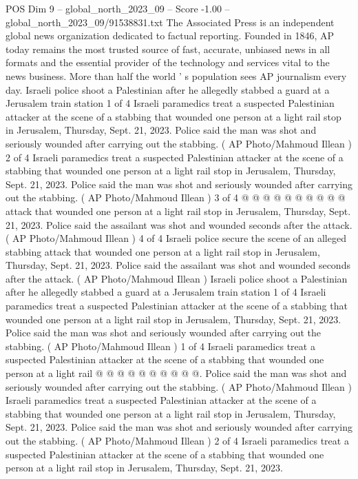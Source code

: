 \begin{textsample}{POS Dim 9 – global\_north\_2023\_09 – Score -1.00 – global\_north\_2023\_09/91538831.txt}  \label{ex:f9_pos_414}
The Associated Press is an independent global news organization dedicated to factual reporting.
Founded in 1846, AP today remains the most trusted source of fast, accurate, unbiased news in all formats and the essential provider of the technology and services vital to the news business.
More than half the world ' s population sees AP journalism every day.
Israeli police shoot a Palestinian after he allegedly stabbed a guard at a Jerusalem train station 1 of 4 Israeli paramedics treat a suspected Palestinian attacker at the scene of a stabbing that wounded one person at a light rail stop in Jerusalem, Thursday, Sept. 21, 2023.
Police said the man was shot and seriously wounded after carrying out the stabbing. ( AP Photo/Mahmoud Illean ) 2 of 4 Israeli paramedics treat a suspected Palestinian attacker at the scene of a stabbing that wounded one person at a light rail stop in Jerusalem, Thursday, Sept. 21, 2023.
Police said the man was shot and seriously wounded after carrying out the stabbing. ( AP Photo/Mahmoud Illean ) 3 of 4 @ @ @ @ @ @ @ @ @ @ attack that wounded one person at a light rail stop in Jerusalem, Thursday, Sept. 21, 2023.
Police said the assailant was shot and wounded seconds after the attack. ( AP Photo/Mahmoud Illean ) 4 of 4 Israeli police secure the scene of an alleged stabbing attack that wounded one person at a light rail stop in Jerusalem, Thursday, Sept. 21, 2023.
Police said the assailant was shot and wounded seconds after the attack. ( AP Photo/Mahmoud Illean ) Israeli police shoot a Palestinian after he allegedly stabbed a guard at a Jerusalem train station 1 of 4 Israeli paramedics treat a suspected Palestinian attacker at the scene of a stabbing that wounded one person at a light rail stop in Jerusalem, Thursday, Sept. 21, 2023.
Police said the man was shot and seriously wounded after carrying out the stabbing. ( AP Photo/Mahmoud Illean ) 1 of 4 Israeli paramedics treat a suspected Palestinian attacker at the scene of a stabbing that wounded one person at a light rail @ @ @ @ @ @ @ @ @ @.
Police said the man was shot and seriously wounded after carrying out the stabbing. ( AP Photo/Mahmoud Illean ) Israeli paramedics treat a suspected Palestinian attacker at the scene of a stabbing that wounded one person at a light rail stop in Jerusalem, Thursday, Sept. 21, 2023.
Police said the man was shot and seriously wounded after carrying out the stabbing. ( AP Photo/Mahmoud Illean ) 2 of 4 Israeli paramedics treat a suspected Palestinian attacker at the scene of a stabbing that wounded one person at a light rail stop in Jerusalem, Thursday, Sept. 21, 2023.

\end{textsample}
